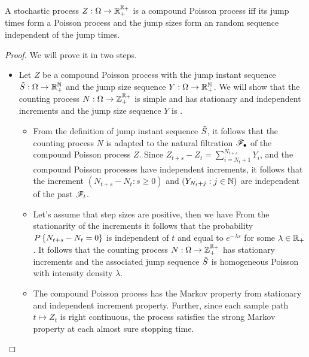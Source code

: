 \documentclass[a4paper,english,10pt]{article}
\begin{document}
\begin{prop}
A stochastic process $Z:\Omega\to\mathbb{R}_+^{\mathbb{R}_+}$ is a compound Poisson process iff its jump times form a Poisson process and the jump sizes form an \iid random sequence independent of the jump times. 
\end{prop}
\begin{proof} 
We will prove it in two steps. 
\begin{itemize} 
\item[Implication:] 
Let $Z$ be a compound Poisson process with the jump instant sequence $\tilde{S}:\Omega\to\mathbb{R}_+^{\mathbb{N}}$ and the jump size sequence $Y:\Omega\to\mathbb{R}_+^{\mathbb{N}}$. 
We will show that the counting process $N:\Omega\to\mathbb{Z}_+^{\mathbb{R}_+}$ is simple and has stationary and independent increments and the jump size sequence $Y$ is \iid. 
\begin{itemize}
\item[Independence of jumps and increments:] 
From the definition of jump instant sequence $\tilde{S}$, it follows that the counting process $N$ is adapted to the natural filtration $\mathscr{F}_\bullet$ of the compound Poisson process $Z$. 
Since $Z_{t+s} - Z_t = \sum_{i = N_t+1}^{N_{t+s}}Y_i$, and the compound Poisson processes have independent increments, 
it follows that the increment $(N_{t+s}-N_t: s \ge 0)$ and $(Y_{N_t+j}: j \in \mathbb{N})$ are independent of the past $\mathscr{F}_t$. %
\item[Stationarity:] Let's assume that step sizes are positive, then
we have 
From the stationarity of the increments it follows that the probability $P\left\{N_{t+s}-N_t = 0\right\}$ is independent of $t$ and equal to $e^{-\lambda s}$ for some $\lambda \in \mathbb{R}_+$.  
It follows that the counting process $N:\Omega\to\mathbb{Z}_+^{\mathbb{R}_+}$ has stationary increments and the associated jump sequence $\tilde{S}$ is homogeneous Poisson with intensity density $\lambda$.  

\item[Strong Markovity:] The compound Poisson process has the Markov property from stationary and independent increment property. 
Further, since each sample path $t \mapsto Z_t$ is right continuous, the process satisfies the strong Markov property at each almost sure stopping time. 


\end{itemize}
\end{itemize}
\end{proof}
\end{document}
